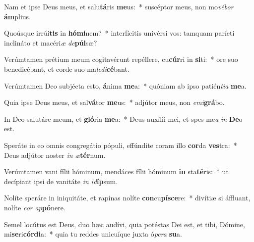 \item Nam et ipse Deus meus, et salu\textbf{tá}ris \textbf{me}us:~* suscéptor meus, non mo\textit{vé}\textit{bor} \textbf{ám}plius.
\item Quoúsque irrúi\textbf{tis} in \textbf{hó}\textbf{mi}nem?~* interfícitis univérsi vos: tamquam paríeti inclináto et macéri\textit{æ} \textit{de}\textbf{púl}sæ?
\item Verúmtamen prétium meum cogitavérunt repéllere, cu\textbf{cúr}ri in \textbf{si}ti:~* ore suo benedicébant, et corde suo ma\textit{le}\textit{di}\textbf{cé}bant.
\item Verúmtamen Deo subjécta esto, \textbf{á}nima \textbf{me}a:~* quóniam ab ipso patién\textit{ti}\textit{a} \textbf{me}a.
\item Quia ipse Deus meus, et sal\textbf{vá}tor \textbf{me}us:~* adjútor meus, non \textit{e}\textit{mi}\textbf{grá}bo.
\item In Deo salutáre meum, et \textbf{gló}ria \textbf{me}a:~* Deus auxílii mei, et spes me\textit{a} \textit{in} \textbf{De}o est.
\item Speráte in eo omnis congregátio pópuli, effúndite coram illo \textbf{cor}da \textbf{ves}tra:~* Deus adjútor noster \textit{in} \textit{æ}\textbf{tér}num.
\item Verúmtamen vani fílii hóminum, mendáces fílii hóminum \textbf{in} sta\textbf{té}ris:~* ut decípiant ipsi de vanitáte \textit{in} \textit{id}\textbf{íp}sum.
\item Nolíte speráre in iniquitáte, et rapínas nolíte \textbf{con}cu\textbf{pí}\textbf{sce}re:~* divítiæ si áffluant, nolíte \textit{cor} \textit{ap}\textbf{pó}nere.
\item Semel locútus est Deus, duo hæc audívi, quia potéstas Dei est, et tibi, Dómine, mi\textbf{se}ri\textbf{cór}\textbf{di}a:~* quia tu reddes unicuíque juxta ó\textit{pe}\textit{ra} \textbf{su}a.
